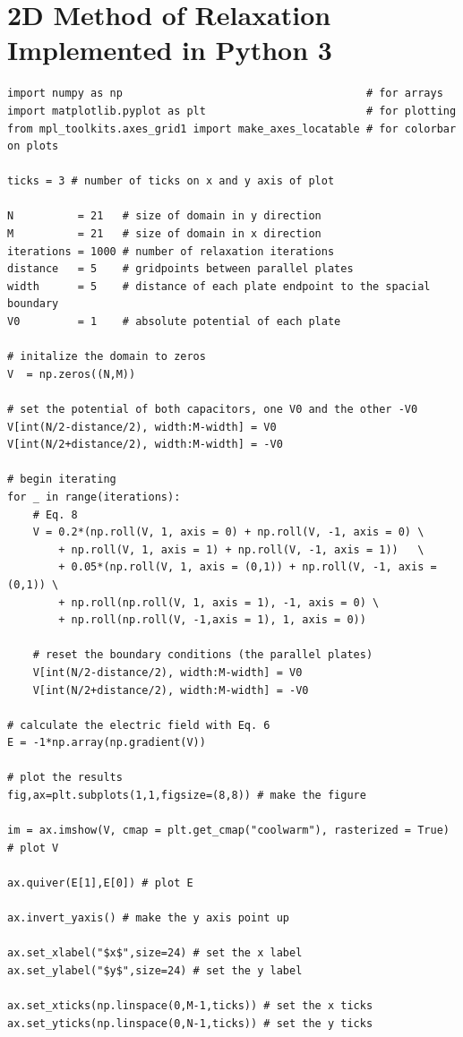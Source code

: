 \documentclass[12pt,twocolumn]{article}
\begin{document}
\section{2D Method of Relaxation Implemented in Python 3}
\label{ap:fullcode}
\begin{verbatim}
import numpy as np                                      # for arrays
import matplotlib.pyplot as plt                         # for plotting
from mpl_toolkits.axes_grid1 import make_axes_locatable # for colorbar on plots

ticks = 3 # number of ticks on x and y axis of plot

N          = 21   # size of domain in y direction
M          = 21   # size of domain in x direction
iterations = 1000 # number of relaxation iterations
distance   = 5    # gridpoints between parallel plates
width      = 5    # distance of each plate endpoint to the spacial boundary
V0         = 1    # absolute potential of each plate

# initalize the domain to zeros
V  = np.zeros((N,M))

# set the potential of both capacitors, one V0 and the other -V0
V[int(N/2-distance/2), width:M-width] = V0
V[int(N/2+distance/2), width:M-width] = -V0

# begin iterating
for _ in range(iterations):
    # Eq. 8
    V = 0.2*(np.roll(V, 1, axis = 0) + np.roll(V, -1, axis = 0) \
        + np.roll(V, 1, axis = 1) + np.roll(V, -1, axis = 1))   \
        + 0.05*(np.roll(V, 1, axis = (0,1)) + np.roll(V, -1, axis = (0,1)) \
        + np.roll(np.roll(V, 1, axis = 1), -1, axis = 0) \
        + np.roll(np.roll(V, -1,axis = 1), 1, axis = 0))

    # reset the boundary conditions (the parallel plates)
    V[int(N/2-distance/2), width:M-width] = V0
    V[int(N/2+distance/2), width:M-width] = -V0

# calculate the electric field with Eq. 6
E = -1*np.array(np.gradient(V))

# plot the results
fig,ax=plt.subplots(1,1,figsize=(8,8)) # make the figure

im = ax.imshow(V, cmap = plt.get_cmap("coolwarm"), rasterized = True) # plot V

ax.quiver(E[1],E[0]) # plot E

ax.invert_yaxis() # make the y axis point up

ax.set_xlabel("$x$",size=24) # set the x label
ax.set_ylabel("$y$",size=24) # set the y label

ax.set_xticks(np.linspace(0,M-1,ticks)) # set the x ticks
ax.set_yticks(np.linspace(0,N-1,ticks)) # set the y ticks


\end{verbatim}
\end{document}
